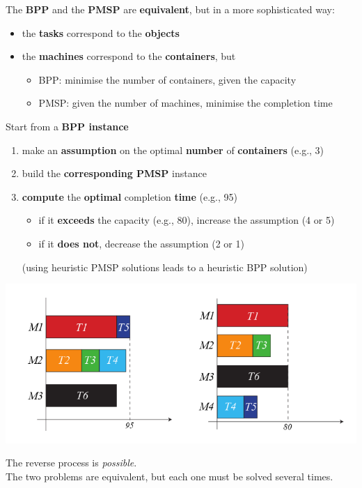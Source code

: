 The \textbf{BPP} and the \textbf{PMSP} are \textbf{equivalent}, but in a more sophisticated way:
\begin{itemize}
	\item the \textbf{tasks} correspond to the \textbf{objects}
	\item the \textbf{machines} correspond to the \textbf{containers}, but
	\begin{itemize}
		\item BPP: minimise the number of containers, given the capacity
		\item PMSP: given the number of machines, minimise the completion time
	\end{itemize}
\end{itemize}
Start from a \textbf{BPP instance}
\begin{enumerate}
	\item make an \textbf{assumption} on the optimal \textbf{number} of \textbf{containers} (e.g., 3)
	\item build the \textbf{corresponding PMSP} instance
	\item \textbf{compute} the \textbf{optimal} completion \textbf{time} (e.g., 95)
	\begin{itemize}
		\item if it \textbf{exceeds} the capacity (e.g., 80), increase the assumption (4 or 5)
		\item if it \textbf{does not}, decrease the assumption (2 or 1)
	\end{itemize}
	(using heuristic PMSP solutions leads to a heuristic BPP solution)
\end{enumerate}

\begin{center}
	\includegraphics[width=0.8\columnwidth]{img/interlude53}
\end{center}

The reverse process is \textit{possible}.\\

The two problems are equivalent, but each one must be solved several times.\\

